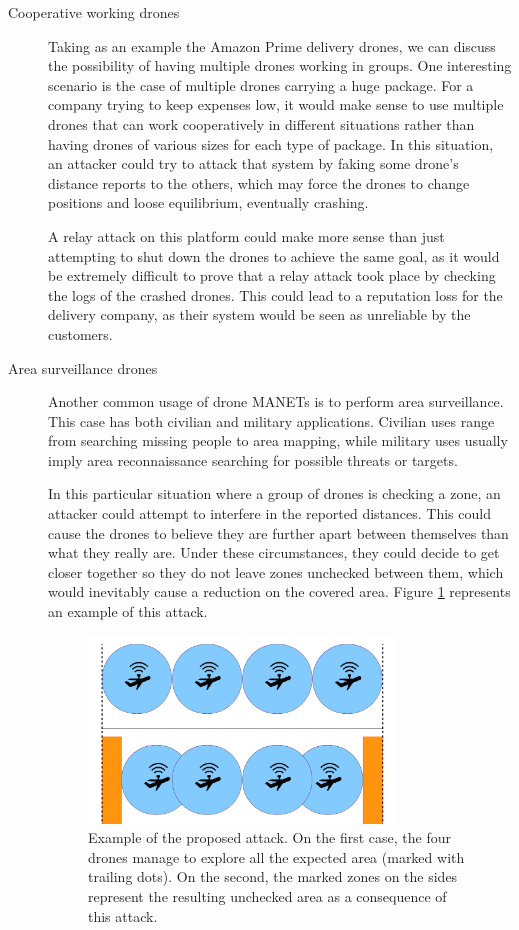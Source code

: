 \documentclass{article}
\begin{document}
\begin{description}
  \item[Cooperative working drones] Taking as an example the Amazon Prime delivery drones, we can discuss the possibility of having multiple drones working in groups. One interesting scenario is the case of multiple drones carrying a huge package. For a company trying to keep expenses low, it would make sense to use multiple drones that can work cooperatively in different situations rather than having drones of various sizes for each type of package. In this situation, an attacker could try to attack that system by faking some drone's distance reports to the others, which may force the drones to change positions and loose equilibrium, eventually crashing.
 
  A relay attack on this platform could make more sense than just attempting to shut down the drones to achieve the same goal, as it would be extremely difficult to prove that a relay attack took place by checking the logs of the crashed drones. This could lead to a reputation loss for the delivery company, as their system would be seen as unreliable by the customers.
  
  
  \item[Area surveillance drones] Another common usage of drone MANETs is to perform area surveillance. This case has both civilian and military applications. Civilian uses range from searching missing people to area mapping, while military uses usually imply area reconnaissance searching for possible threats or targets. 
  
  In this particular situation where a group of drones is checking a zone, an attacker could attempt to interfere in the reported distances. This could cause the drones to believe they are further apart between themselves than what they really are. Under these circumstances, they could decide to get closer together so they do not leave zones unchecked between them, which would inevitably cause a reduction on the covered area. Figure \ref{fig:attackexample2} represents an example of this attack.
  
  \begin{figure}[h!]
  \centering
    \includegraphics[width=0.8\textwidth]{images/attack2.png}
  \caption{Example of the proposed attack. On the first case, the four drones manage to explore all the expected area (marked with trailing dots). On the second, the marked zones on the sides represent the resulting unchecked area as a consequence of this attack.}
  \label{fig:attackexample2}
\end{figure}


\end{description}
\end{document}
